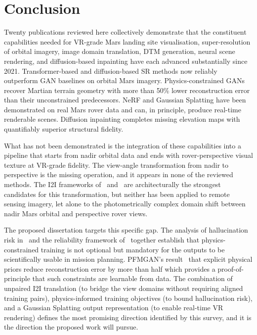 \documentclass[10pt,journal]{IEEEtran}
\begin{document}
\section{Conclusion}
\label{sec:conclusion}

Twenty publications reviewed here collectively demonstrate that the constituent
capabilities needed for VR-grade Mars landing site visualisation, super-resolution
of orbital imagery, image domain translation, DTM generation, neural scene
rendering, and diffusion-based inpainting have each advanced substantially
since 2021. Transformer-based and diffusion-based SR methods now reliably
outperform GAN baselines on orbital Mars imagery. Physics-constrained GANs
recover Martian terrain geometry with more than 50\% lower reconstruction error
than their unconstrained predecessors. NeRF and Gaussian Splatting have been
demonstrated on real Mars rover data and can, in principle, produce real-time
renderable scenes. Diffusion inpainting completes missing elevation maps with
quantifiably superior structural fidelity.

What has not been demonstrated is the integration of these capabilities into
a pipeline that starts from nadir orbital data and ends with rover-perspective
visual texture at VR-grade fidelity. The view-angle transformation from
nadir to perspective is the missing operation, and it appears in none of the
reviewed methods. The I2I frameworks of~\cite{kim2024unsb} and~\cite{xiao2025brownian}
are architecturally the strongest candidates for this transformation, but neither
has been applied to remote sensing imagery, let alone to the photometrically
complex domain shift between nadir Mars orbital and perspective rover views.

The proposed dissertation targets this specific gap. The analysis of
hallucination risk in~\cite{aithal2024hallucination} and the reliability
framework of~\cite{rathkopf2025reliability} together establish that
physics-constrained training is not optional but mandatory for the outputs to
be scientifically usable in mission planning. PFMGAN's result~\cite{zou2026pfmgan}
that explicit physical priors reduce reconstruction error by more than half which
provides a proof-of-principle that such constraints are learnable from data.
The combination of unpaired I2I translation (to bridge the view domains without
requiring aligned training pairs), physics-informed training objectives (to bound
hallucination risk), and a Gaussian Splatting output representation (to enable
real-time VR rendering) defines the most promising direction identified by this
survey, and it is the direction the proposed work will pursue.



\end{document}

